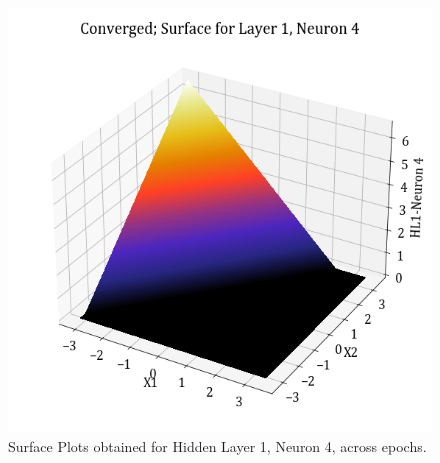 \documentclass[11pt,a4paper]{article}
\begin{document}
\begin{figure}[H]
    \includegraphics[scale=0.4]{images/1B_MLFFNN_conv_HL1_N4.png}
    \caption{Surface Plots obtained for Hidden Layer 1, Neuron 4, across epochs.}
\end{figure}
\end{document}
